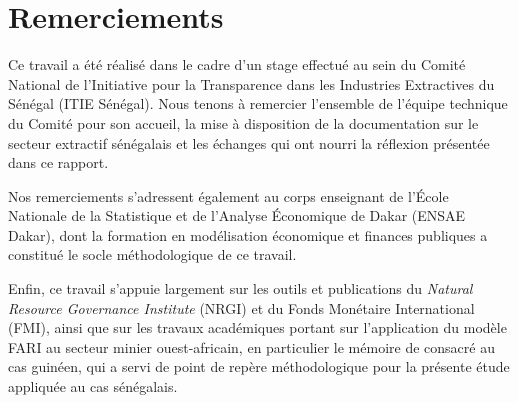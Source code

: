 \chapter*{Remerciements}

Ce travail a été réalisé dans le cadre d'un stage effectué au sein du Comité National de l'Initiative pour la Transparence dans les Industries Extractives du Sénégal (ITIE Sénégal). Nous tenons à remercier l'ensemble de l'équipe technique du Comité pour son accueil, la mise à disposition de la documentation sur le secteur extractif sénégalais et les échanges qui ont nourri la réflexion présentée dans ce rapport.

Nos remerciements s'adressent également au corps enseignant de l'École Nationale de la Statistique et de l'Analyse Économique de Dakar (ENSAE Dakar), dont la formation en modélisation économique et finances publiques a constitué le socle méthodologique de ce travail.

Enfin, ce travail s'appuie largement sur les outils et publications du \emph{Natural Resource Governance Institute} (NRGI) et du Fonds Monétaire International (FMI), ainsi que sur les travaux académiques portant sur l'application du modèle FARI au secteur minier ouest-africain, en particulier le mémoire de \citet{kourouma2019} consacré au cas guinéen, qui a servi de point de repère méthodologique pour la présente étude appliquée au cas sénégalais.
